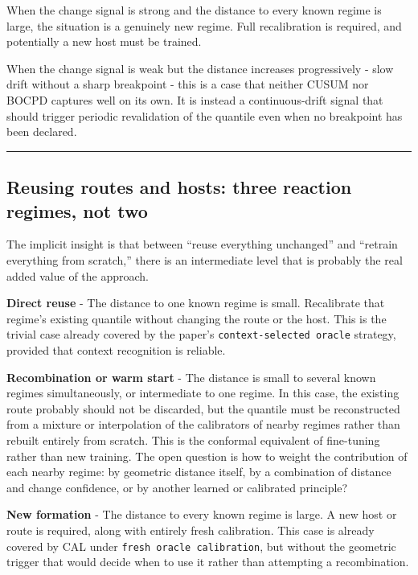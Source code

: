 When the change signal is strong and the distance to every known regime is large, the situation is a genuinely new regime. Full recalibration is required, and potentially a new host must be trained.

When the change signal is weak but the distance increases progressively - slow drift without a sharp breakpoint - this is a case that neither CUSUM nor BOCPD captures well on its own. It is instead a continuous-drift signal that should trigger periodic revalidation of the quantile even when no breakpoint has been declared.

\begin{center}\rule{0.5\linewidth}{0.5pt}\end{center}

\subsection{Reusing routes and hosts: three reaction regimes, not two}\label{reusing-routes-and-hosts-three-reaction-regimes-not-two}

The implicit insight is that between ``reuse everything unchanged'' and ``retrain everything from scratch,'' there is an intermediate level that is probably the real added value of the approach.

\textbf{Direct reuse} - The distance to one known regime is small. Recalibrate that regime's existing quantile without changing the route or the host. This is the trivial case already covered by the paper's \passthrough{\lstinline!context-selected oracle!} strategy, provided that context recognition is reliable.

\textbf{Recombination or warm start} - The distance is small to several known regimes simultaneously, or intermediate to one regime. In this case, the existing route probably should not be discarded, but the quantile must be reconstructed from a mixture or interpolation of the calibrators of nearby regimes rather than rebuilt entirely from scratch. This is the conformal equivalent of fine-tuning rather than new training. The open question is how to weight the contribution of each nearby regime: by geometric distance itself, by a combination of distance and change confidence, or by another learned or calibrated principle?

\textbf{New formation} - The distance to every known regime is large. A new host or route is required, along with entirely fresh calibration. This case is already covered by CAL under \passthrough{\lstinline!fresh oracle calibration!}, but without the geometric trigger that would decide when to use it rather than attempting a recombination.

